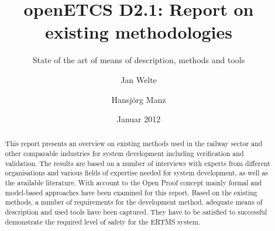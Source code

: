 \documentclass{./template/openetcs2}
\begin{document}
\frontmatter
{}




\title{openETCS D2.1: Report on existing methodologies}

\subtitle{State of the art of means of description, methods and tools}

\date{Januar 2012}

\author{Jan Welte \and Hansj\"org Manz}





\begin{abstract}
	This report presents an overview on existing methods used in the railway sector and other comparable industries for system development including verification and validation. The results are based on a number of interviews with experts from different organisations and various fields of expertise needed for system development, as well as the available literature. With account to the Open Proof concept mainly formal and model-based approaches have been examined for this report. Based on the existing methods, a number of requirements for the development method, adequate means of description and used tools have been captured. They have to be satisfied to successful demonstrate the required level of safety for the ERTMS system.
\end{abstract}

\maketitle
\tableofcontents
\listoffiguresandtables
\end{document}
